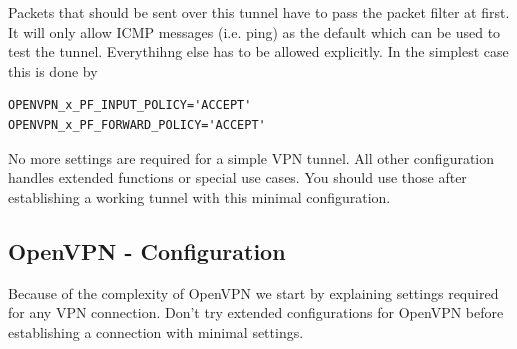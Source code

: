 \begin{description}
\begin{itemize}
  \end{itemize}

  \item [\smalljump{OPENVPNxPFINPUTN}{input\_list},
  \smalljump{OPENVPNxPFFORWARDN}{forward\_list}] Packets that should be 
  sent over this tunnel have to pass the packet filter at first. It will 
  only allow ICMP messages (i.e. ping) as the default which can be used to 
  test the tunnel. Everythihng else has to be allowed explicitly. 
  In the simplest case this is done by

\begin{example}
\begin{verbatim}
OPENVPN_x_PF_INPUT_POLICY='ACCEPT'
OPENVPN_x_PF_FORWARD_POLICY='ACCEPT'
\end{verbatim}
\end{example}


  \end{description}

No more settings are required for a simple VPN tunnel. All other 
configuration handles extended functions or special use cases. You 
should use those after establishing a working tunnel with this minimal 
configuration. 

\subsection{OpenVPN - Configuration}

Because of the complexity of OpenVPN we start by explaining settings 
required for any VPN connection. Don't try extended configurations 
for OpenVPN before establishing a connection with minimal settings.

